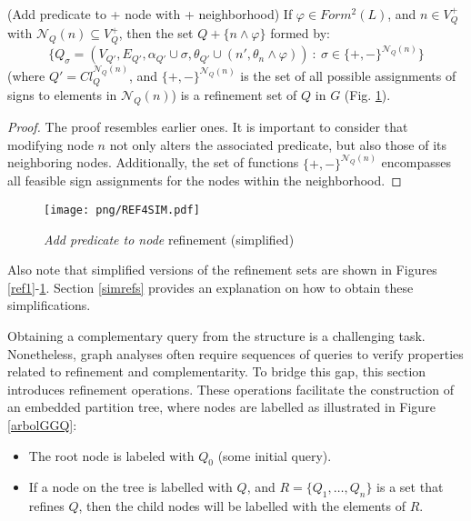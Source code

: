\documentclass{article}%
\begin{document}
\begin{theorem}{(Add predicate to + node with + neighborhood)}
    If $\varphi\in Form^2(L)$, and $n\in V_Q^+$ with $\mathcal{N}_Q(n)\subseteq V_Q^+$, then the set $Q+\{n\wedge \varphi\}$ formed by:
    $$\{Q_{\sigma}=(V_{Q'},E_{Q'},\alpha_{Q'}\cup \sigma,\theta_{Q'}\cup(n',\theta_n\wedge\varphi))\ :\ \sigma\in \{+,-\}^{\mathcal{N}_Q(n)}\}$$ 	
(where $Q'=Cl_Q^{\mathcal{N}_Q(n)}$, and $\{+,-\}^{\mathcal{N}_Q(n)}$ is the set of all possible assignments of signs to elements in $\mathcal{N}_Q(n)$)
is a refinement set of $Q$ in $G$ (Fig. \ref{ref4}).
\end{theorem}
\normalsize
\begin{proof}{}
	The proof resembles earlier ones. It is important to consider that modifying node $n$ not only alters the associated predicate, but also those of its neighboring nodes. Additionally, the set of functions $\{+, -\}^{\mathcal{N}_Q(n)}$ encompasses all feasible sign assignments for the nodes within the neighborhood.
\end{proof}

\begin{figure}[h]
    \begin{center}
        \texttt{[image: png/REF4SIM.pdf]}
    \end{center}
    \caption{%
        \textit{Add predicate to node} refinement (simplified)
    }%
    \label{ref4}
\end{figure}

Also note that simplified versions of the refinement sets are shown in Figures \ref{ref1}-\ref{ref4}. Section \ref{simrefs} provides an explanation on how to obtain these simplifications.

Obtaining a complementary query from the structure is a challenging task. Nonetheless, graph analyses often require sequences of queries to verify properties related to refinement and complementarity. To bridge this gap, this section introduces refinement operations. These operations facilitate the construction of an embedded partition tree, where nodes are labelled as illustrated in Figure \ref{arbolGGQ}:

\begin{itemize}
    \item The root node is labeled with $ Q_0 $ (some initial query).
    \item If a node on the tree is labelled with $Q$, and $R=\{Q_1,\dots,Q_n\}$ is a set that refines $Q$, then the child nodes will be labelled with the elements of $R$.
\end{itemize}
\end{document}
